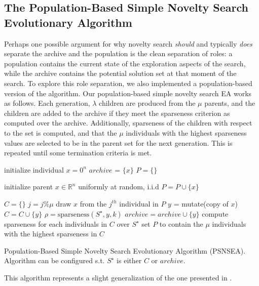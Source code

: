 \documentclass[twoside]{article}
\newcommand{\IR}{\mathbb{R}}
\begin{document}
\subsection{The Population-Based Simple Novelty Search Evolutionary Algorithm}
\label{subsec:psns}
Perhaps one possible argument for why novelty search \emph{should} and typically \emph{does} separate the archive and the population is the clean separation of roles:  a population contains the current state of the exploration aspects of the search, while the archive contains the potential solution set at that moment of the search.  To explore this role separation, we also implemented a population-based version of the algorithm.  Our population-based simple novelty search EA works as follows.  Each generation, $\lambda$ children are produced from the $\mu$ parents, and the children are added to the archive if they meet the sparseness criterion as computed over the archive.  Additionally, sparseness of the children with respect to the set is computed, and that the $\mu$ individuals with the highest sparseness values are selected to be in the parent set for the next generation.  This is repeated until some termination criteria is met.  
%
\begin{algorithm}[ht]
  \SetAlgoLined
  \DontPrintSemicolon 
  
  \;
    
  initialize individual $x = 0^n$\;
  $archive$ = $\{x\}$\;
  $P = \{\}$
  
   {
    initialize parent $x \in \IR^n$ uniformly at random, i.i.d\;
    $P = P \cup \{x\}$\;
   }
   
   {
    $C = \{\}$\;
     {
      $j = j \% \mu$\;
      draw $x$ from the $j^{th}$ individual in $P$\;
      $y$ = mutate(copy of $x$)\;
      $C = C \cup \{y\}$\;
      $\rho = \mbox{sparseness}(S^\star, y, k)$\;
       {
        $archive = archive \cup \{y\}$\;
        }
     }
    compute sparseness for each individuals in $C$ over $S^\star$\;
    set $P$ to contain the $\mu$ individuals with the highest sparseness in $C$\; 
  }
  \caption{Population-Based Simple Novelty Search Evolutionary Algorithm (PSNSEA).  Algorithm can be configured s.t. $S^\star$ is either $C$ or $archive$.}
\end{algorithm}
%
This algorithm represents a slight generalization of the one presented in \citet{Wiegand2021flairs}.
\end{document}
